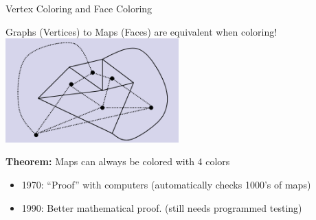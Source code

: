 \begin{frame}{Vertex Coloring and Face Coloring}

    \begin{center}
      Graphs (Vertices) to Maps (Faces) are equivalent when coloring!\\
      \includegraphics[width=0.5\textwidth]{../img/facecolor}
    \end{center}

    {\bf Theorem:} Maps can always be colored with 4 colors
    \begin{itemize}
    \item 1970: ``Proof'' with computers (automatically checks 1000's of maps)
    \item 1990: Better mathematical proof. (still needs programmed testing)
    \end{itemize}
\end{frame}

